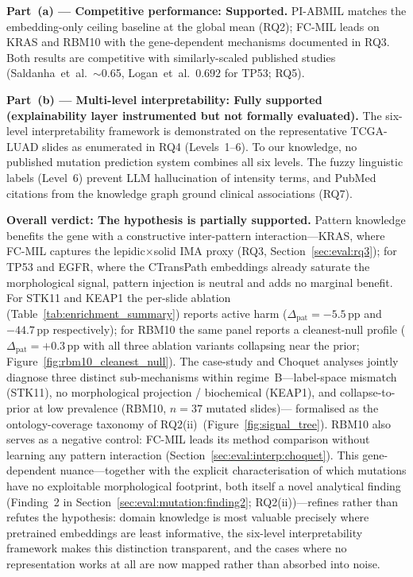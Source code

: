 \textbf{Part~(a) --- Competitive performance: Supported.}
PI-ABMIL matches the embedding-only ceiling baseline at the global
mean (RQ2); FC-MIL leads on KRAS and RBM10 with the gene-dependent
mechanisms documented in RQ3.
Both results are competitive with similarly-scaled published studies
(Saldanha~et~al.\ $\sim$0.65, Logan~et~al.\ $0.692$ for TP53;
RQ5).

\textbf{Part~(b) --- Multi-level interpretability: Fully supported
(explainability layer instrumented but not formally evaluated).}
The six-level interpretability framework is demonstrated on the
representative TCGA-LUAD slides as enumerated in RQ4 (Levels~1--6).
To our knowledge, no published mutation prediction system combines
all six levels.
The fuzzy linguistic labels (Level~6) prevent LLM hallucination of
intensity terms, and PubMed citations from the knowledge graph
ground clinical associations (RQ7).

\textbf{Overall verdict: The hypothesis is partially supported.}
Pattern knowledge benefits the gene with a constructive
inter-pattern interaction---KRAS, where FC-MIL captures the
lepidic$\times$solid IMA proxy
(RQ3, Section~\ref{sec:eval:rq3}); for TP53 and EGFR, where the
CTransPath embeddings already saturate the morphological signal,
pattern injection is neutral and adds no marginal benefit.
For STK11 and KEAP1 the per-slide ablation
(Table~\ref{tab:enrichment_summary}) reports active harm
($\Delta_{\mathrm{pat}} = -5.5$\,pp and $-44.7$\,pp respectively);
for RBM10 the same panel reports a cleanest-null profile
($\Delta_{\mathrm{pat}} = +0.3$\,pp with all three ablation variants
collapsing near the prior; Figure~\ref{fig:rbm10_cleanest_null}).
The case-study and Choquet analyses jointly diagnose three distinct
sub-mechanisms within regime~B---label-space mismatch (STK11),
no morphological projection / biochemical (KEAP1), and
collapse-to-prior at low prevalence
(RBM10, $n = 37$ mutated slides)---%
formalised as the ontology-coverage taxonomy of
RQ2(ii)~(Figure~\ref{fig:signal_tree}).
RBM10 also serves as a negative control: FC-MIL leads its method
comparison without learning any pattern interaction
(Section~\ref{sec:eval:interp:choquet}).
This gene-dependent nuance---together with the explicit
characterisation of which mutations have no exploitable
morphological footprint, both itself a novel analytical finding
(Finding~2 in Section~\ref{sec:eval:mutation:finding2};
RQ2(ii))---refines rather than refutes the hypothesis: domain
knowledge is most valuable precisely where pretrained embeddings
are least informative, the six-level interpretability framework
makes this distinction transparent, and the cases where no
representation works at all are now mapped rather than absorbed
into noise.


